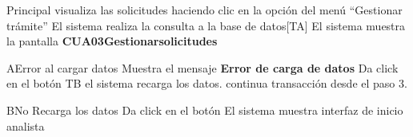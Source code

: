 \begin{UCtrayectoria}{Principal}
  \UCpaso[\UCactor] visualiza las solicitudes haciendo clic en la opción del menú “Gestionar trámite”
  \UCpaso El sistema realiza la consulta a la base de datos[TA]
  \UCpaso El sistema muestra la pantalla  {\bf CUA03Gestionarsolicitudes}
\end{UCtrayectoria}

\begin{UCtrayectoriaA}{A}{Error al cargar datos} 
\UCpaso Muestra el mensaje {\bf Error de carga de datos}
  \UCpaso[\UCactor] Da click en el botón  {TB} 
  \UCpaso el sistema recarga los datos.
  \UCpaso continua transacción desde el paso 3.
\end{UCtrayectoriaA}

\begin{UCtrayectoriaA}{B}{No Recarga los datos} 
  \UCpaso Da click en el botón 
  \UCpaso El sistema muestra interfaz de inicio analista
\end{UCtrayectoriaA}

